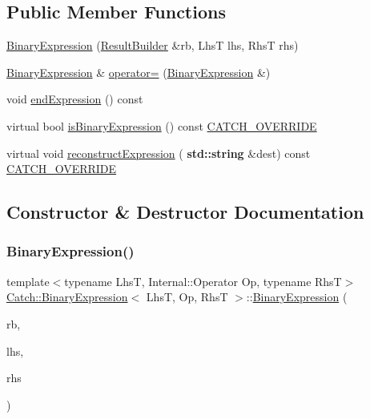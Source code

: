\subsection*{Public Member Functions}
\begin{DoxyCompactItemize}
\item 
\hyperlink{class_catch_1_1_binary_expression_a0d81384761aba5f7a6d5f4fc7e7944f3}{Binary\+Expression} (\hyperlink{class_catch_1_1_result_builder}{Result\+Builder} \&rb, LhsT lhs, RhsT rhs)
\item 
\hyperlink{class_catch_1_1_binary_expression}{Binary\+Expression} \& \hyperlink{class_catch_1_1_binary_expression_a2147a858eb5866e5643d0ef321064aa1}{operator=} (\hyperlink{class_catch_1_1_binary_expression}{Binary\+Expression} \&)
\item 
void \hyperlink{class_catch_1_1_binary_expression_aa1dba7f316f70902859b8eab27692dfb}{end\+Expression} () const
\item 
virtual bool \hyperlink{class_catch_1_1_binary_expression_a4c617c0b6a73a9cafbbf900909c7c258}{is\+Binary\+Expression} () const \hyperlink{catch_8hpp_a8ecdce4d3f57835f707915ae831eb847}{C\+A\+T\+C\+H\+\_\+\+O\+V\+E\+R\+R\+I\+DE}
\item 
virtual void \hyperlink{class_catch_1_1_binary_expression_a6ed73ff9af9c229f9fa3d35d019f9e37}{reconstruct\+Expression} (\textbf{ std\+::string} \&dest) const \hyperlink{catch_8hpp_a8ecdce4d3f57835f707915ae831eb847}{C\+A\+T\+C\+H\+\_\+\+O\+V\+E\+R\+R\+I\+DE}
\end{DoxyCompactItemize}


\subsection{Constructor \& Destructor Documentation}
\mbox{\label{class_catch_1_1_binary_expression_a0d81384761aba5f7a6d5f4fc7e7944f3}} 
\subsubsection{\texorpdfstring{Binary\+Expression()}{BinaryExpression()}}
{\footnotesize\ttfamily template$<$typename LhsT, Internal\+::\+Operator Op, typename RhsT$>$ \\
\hyperlink{class_catch_1_1_binary_expression}{Catch\+::\+Binary\+Expression}$<$ LhsT, Op, RhsT $>$\+::\hyperlink{class_catch_1_1_binary_expression}{Binary\+Expression} (\begin{DoxyParamCaption}\item[{\hyperlink{class_catch_1_1_result_builder}{Result\+Builder} \&}]{rb,  }\item[{LhsT}]{lhs,  }\item[{RhsT}]{rhs }\end{DoxyParamCaption})\hspace{0.3cm}{\ttfamily [inline]}}



